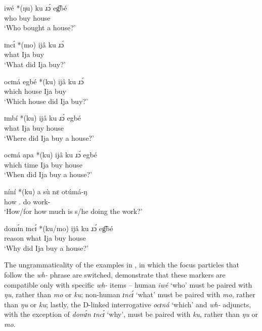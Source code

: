 \documentclass[output=paper,colorlinks,citecolor=brown
]{langscibook}
\begin{document}
\ea \label{ex:matte:9}
\begin{xlist}

\ex \label{ex:matte:9a}
\gll iwé *(ŋu) {\longrule} ku ɹɔ́ eg͡bé\\
who \Foc{} {} \Pfv{} buy house\\
\glt `Who bought a house?'

\ex \label{ex:matte:9b}
\gll ɪncɪ́ *(mo) ijâ ku ɹɔ́ {\longrule}\\
what \Foc{} Ija \Pfv{} buy {}\\
\glt `What did Ija buy?'

\ex \label{ex:matte:9g}
\gll ocɪná egbé *(ku) ijâ ku ɹɔ́ {\longrule}\\
which house \Foc{} Ija \Pfv{} buy {}\\
\glt `Which house did Ija buy?'

\ex \label{ex:matte:9c}
\gll ɪmbí *(ku) ijâ ku ɹɔ́ egbé {\longrule}\\
what \Foc{} Ija \Pfv{} buy house {}\\
\glt `Where did Ija buy a house?'

\ex \label{ex:matte:9d}
\gll ocɪná apa *(ku) ijâ ku ɹɔ́ egbé {\longrule}\\
which time \Foc{} Ija \Pfv{} buy house {}\\
\glt `When did Ija buy a house?'

\ex \label{ex:matte:9e}
\gll níní *(ku) a sù nɛ otúmá-ŋ {\longrule}\\
how \Foc{} \Tsg{}.\Nom{} \Prog{} do work-\Def{}\\
\glt `How/for how much is s/he doing the work?'

\ex \label{ex:matte:9f}
\gll domɪ́n ɪncɪ́ *(ku/mo) ijâ ku ɹɔ́ eg͡bé {\longrule}\\
reason what \Foc{} Ija \Pfv{} buy house\\
\glt `Why did Ija buy a house?'


\end{xlist}
\z

The ungrammaticality of the examples in , in which the focus particles that follow the \textit{wh-} phrase are switched, demonstrate that these markers are compatible only with specific \textit{wh-} items – human \textit{iwé} `who' must be paired with \textit{ŋu}, rather than \textit{mo} or \textit{ku}; non-human \textit{ɪncɪ́} `what' must be paired with \textit{mo}, rather than \textit{ŋu} or \textit{ku}; lastly, the D-linked interrogative \textit{ocɪná} `which' and \textit{wh-} adjuncts, with the exception of \textit{domɪ́n ɪncɪ́} `why', must be paired with \textit{ku}, rather than \textit{ŋu} or \textit{mo}. 
\end{document}
